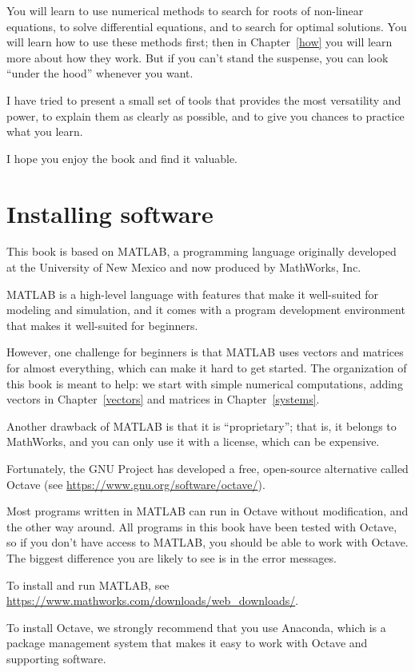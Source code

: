 You will learn to use numerical methods to search for roots of non-linear equations, to solve differential equations, and to search for optimal solutions.  You will learn how to use these methods first; then in Chapter~\ref{how} you will learn more about how they work.  But if you can't stand the suspense, you can look ``under the hood'' whenever you want.

I have tried to present a small set of tools that provides the most versatility and power, to explain them as clearly as possible, and to give you chances to practice what you learn.

I hope you enjoy the book and find it valuable.


\section*{Installing software}

This book is based on MATLAB, a programming language originally developed at the University of New Mexico and now produced by MathWorks, Inc.  

MATLAB is a high-level language with features that make it well-suited for modeling and simulation, and it comes with a program development environment that makes it well-suited for beginners.

However, one challenge for beginners is that MATLAB uses vectors and matrices for almost everything, which can make it hard to get started.  The organization of this book is meant to help: we start with simple numerical computations, adding vectors in Chapter~\ref{vectors} and matrices in Chapter~\ref{systems}.

Another drawback of MATLAB is that it is ``proprietary''; that is, it belongs to MathWorks, and you can only use it with a license, which can be expensive.

Fortunately, the GNU Project has developed a free, open-source alternative called Octave (see \url{https://www.gnu.org/software/octave/}).  

Most programs written in MATLAB can run in Octave without modification, and the other way around.  All programs in this book have been tested with Octave, so if you don't have access to MATLAB, you should be able to work with Octave.  The biggest difference you are likely to see is in the error messages.

To install and run MATLAB, see \url{https://www.mathworks.com/downloads/web_downloads/}.

To install Octave, we strongly recommend that you use Anaconda, which is a package management system that makes it easy to work with Octave and supporting software.

